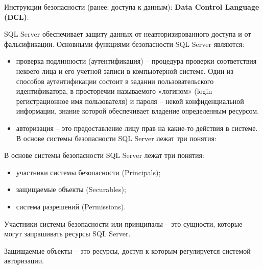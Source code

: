 Инструкции безопасности (ранее: доступа к данным): \textbf{Data Control Language (DСL)}.

SQL Server обеспечивает защиту данных от неавторизированного доступа и от фальсификации. Основными функциями безопасности SQL Server являются:
\begin{itemize}
	\item проверка подлинности (аутентификация) – процедура проверки соответствия некоего лица и его учетной записи в компьютерной системе. Один из способов аутентификации состоит в задании пользовательского идентификатора, в просторечии называемого «логином» (login – регистрационное имя пользователя) и пароля – некой конфиденциальной информации, знание которой обеспечивает владение определенным ресурсом.
	\item авторизация – это предоставление лицу прав на какие-то действия в системе.
	В основе системы безопасности SQL Server лежат три понятия:
\end{itemize}

В основе системы безопасности SQL Server лежат три понятия:
\begin{itemize}
	\item участники системы безопасности (Principals);
	\item защищаемые объекты (Securables);
	\item система разрешений (Permissions).
\end{itemize}

Участники системы безопасности или принципалы – это сущности, которые могут запрашивать ресурсы SQL Server.

Защищаемые объекты – это ресурсы, доступ к которым регулируется системой авторизации.

